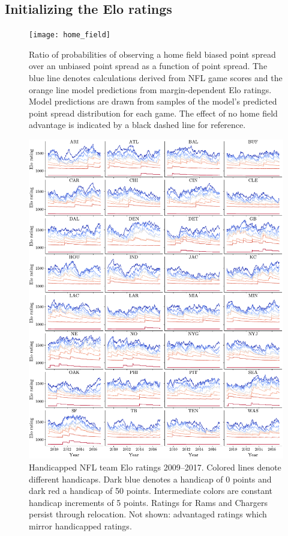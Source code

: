 \documentclass[aps,prc,reprint,amsmath,superscriptaddress]{revtex4-1}
\begin{document}
\subsection{Initializing the Elo ratings}

\begin{figure}
  \texttt{[image: home\_field]}
  \caption{\label{fig:home_field} Ratio of probabilities of observing a home field biased point spread over an unbiased point spread as a function of point spread. The blue line denotes calculations derived from NFL game scores and the orange line model predictions from margin-dependent Elo ratings. Model predictions are drawn from samples of the model's predicted point spread distribution for each game. The effect of no home field advantage is indicated by a black dashed line for reference.}
\end{figure}

\begin{figure}
  \includegraphics{team_history}
  \caption{\label{fig:history} Handicapped NFL team Elo ratings 2009--2017. Colored lines denote different handicaps. Dark blue denotes a handicap of 0 points and dark red a handicap of 50 points. Intermediate colors are constant handicap increments of 5 points. Ratings for Rams and Chargers persist through relocation. Not shown: advantaged ratings which mirror handicapped ratings.}
\end{figure}
\end{document}
